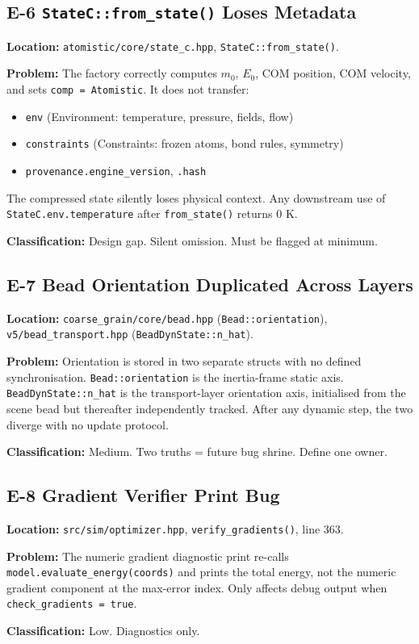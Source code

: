 \documentclass[11pt,a4paper]{article}
\begin{document}
\subsection{E-6 \textemdash{} \texttt{StateC::from\_state()} Loses Metadata}
\begin{mdframed}[backgroundcolor=amber!8]
\textbf{Location:} \texttt{atomistic/core/state\_c.hpp}, \texttt{StateC::from\_state()}.

\textbf{Problem:} The factory correctly computes $m_0$, $E_0$, COM position,
COM velocity, and sets \texttt{comp = Atomistic}. It does not transfer:
\begin{itemize}
  \item \texttt{env} (Environment: temperature, pressure, fields, flow)
  \item \texttt{constraints} (Constraints: frozen atoms, bond rules, symmetry)
  \item \texttt{provenance.engine\_version}, \texttt{.hash}
\end{itemize}
The compressed state silently loses physical context. Any downstream
use of \texttt{StateC.env.temperature} after \texttt{from\_state()} returns 0 K.

\textbf{Classification:} Design gap. Silent omission. Must be flagged at minimum.
\end{mdframed}

\subsection{E-7 \textemdash{} Bead Orientation Duplicated Across Layers}
\begin{mdframed}[backgroundcolor=amber!8]
\textbf{Location:} \texttt{coarse\_grain/core/bead.hpp} (\texttt{Bead::orientation}),
\texttt{v5/bead\_transport.hpp} (\texttt{BeadDynState::n\_hat}).

\textbf{Problem:} Orientation is stored in two separate structs with no
defined synchronisation. \texttt{Bead::orientation} is the inertia-frame
static axis. \texttt{BeadDynState::n\_hat} is the transport-layer orientation
axis, initialised from the scene bead but thereafter independently tracked.
After any dynamic step, the two diverge with no update protocol.

\textbf{Classification:} Medium. Two truths = future bug shrine.
Define one owner.
\end{mdframed}

\subsection{E-8 \textemdash{} Gradient Verifier Print Bug}
\begin{mdframed}[backgroundcolor=gray!8]
\textbf{Location:} \texttt{src/sim/optimizer.hpp}, \texttt{verify\_gradients()}, line 363.

\textbf{Problem:} The numeric gradient diagnostic print re-calls
\texttt{model.evaluate\_energy(coords)} and prints the total energy,
not the numeric gradient component at the max-error index.
Only affects debug output when \texttt{check\_gradients = true}.

\textbf{Classification:} Low. Diagnostics only.
\end{mdframed}
\end{document}
